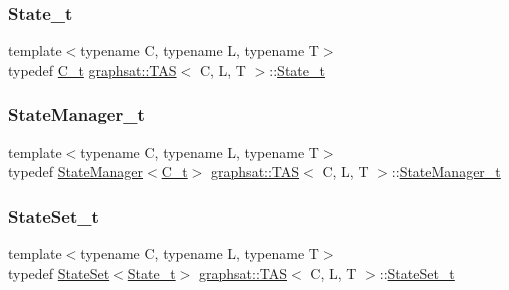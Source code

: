 \mbox{\label{classgraphsat_1_1_t_a_s_a21e6a612eebc293b90e198d4adf25f0f}} 
\subsubsection{\texorpdfstring{State\_t}{State\_t}}
{\footnotesize\ttfamily template$<$typename C, typename L, typename T$>$ \\
typedef \mbox{\hyperlink{classgraphsat_1_1_t_a_s_a05b063b91c0ab2a4f94380de78344d72}{C\+\_\+t}} \mbox{\hyperlink{classgraphsat_1_1_t_a_s}{graphsat\+::\+T\+AS}}$<$ C, L, T $>$\+::\mbox{\hyperlink{classgraphsat_1_1_t_a_s_a21e6a612eebc293b90e198d4adf25f0f}{State\+\_\+t}}}

\mbox{\label{classgraphsat_1_1_t_a_s_ad7b4fb0904029e47aa4ea38fdc0c6ca6}} 
\subsubsection{\texorpdfstring{StateManager\_t}{StateManager\_t}}
{\footnotesize\ttfamily template$<$typename C, typename L, typename T$>$ \\
typedef \mbox{\hyperlink{classgraphsat_1_1_state_manager}{State\+Manager}}$<$\mbox{\hyperlink{classgraphsat_1_1_t_a_s_a05b063b91c0ab2a4f94380de78344d72}{C\+\_\+t}}$>$ \mbox{\hyperlink{classgraphsat_1_1_t_a_s}{graphsat\+::\+T\+AS}}$<$ C, L, T $>$\+::\mbox{\hyperlink{classgraphsat_1_1_t_a_s_ad7b4fb0904029e47aa4ea38fdc0c6ca6}{State\+Manager\+\_\+t}}}

\mbox{\label{classgraphsat_1_1_t_a_s_a5ed864677e2da64583f92b84d38d0717}} 
\subsubsection{\texorpdfstring{StateSet\_t}{StateSet\_t}}
{\footnotesize\ttfamily template$<$typename C, typename L, typename T$>$ \\
typedef \mbox{\hyperlink{classgraphsat_1_1_state_set}{State\+Set}}$<$\mbox{\hyperlink{classgraphsat_1_1_t_a_s_a21e6a612eebc293b90e198d4adf25f0f}{State\+\_\+t}}$>$ \mbox{\hyperlink{classgraphsat_1_1_t_a_s}{graphsat\+::\+T\+AS}}$<$ C, L, T $>$\+::\mbox{\hyperlink{classgraphsat_1_1_t_a_s_a5ed864677e2da64583f92b84d38d0717}{State\+Set\+\_\+t}}}

